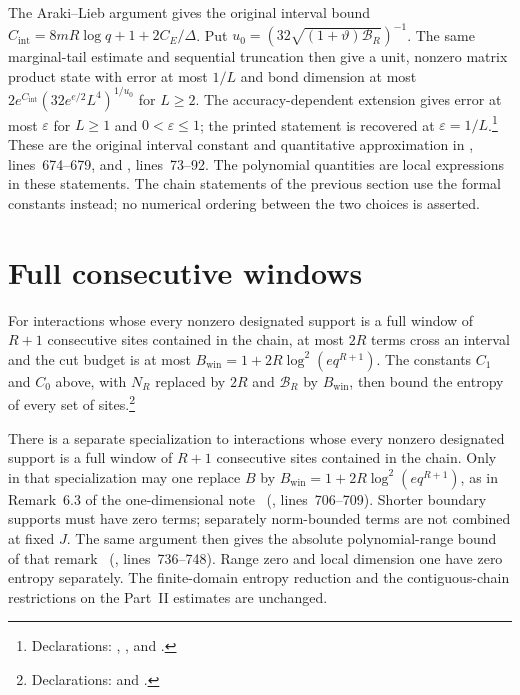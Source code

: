 \documentclass{article}
\begin{document}
The Araki--Lieb argument gives the original interval bound
$C_{\mathrm{int}}=8mR\log q+1+2C_E/\Delta$.
Put $u_0=(32\sqrt{(1+\vartheta)\mathcal B_R})^{-1}$.
The same marginal-tail estimate and sequential truncation then give a unit,
nonzero matrix product state with error at most $1/L$ and bond dimension at most
$2e^{C_{\mathrm{int}}}(32e^{e/2}L^4)^{1/u_0}$ for $L\ge2$.
The accuracy-dependent extension gives error at most $\varepsilon$ for
$L\ge1$ and $0<\varepsilon\le1$; the printed statement is recovered at
$\varepsilon=1/L$.\footnote{Declarations:
    ,
    , and
    .}
These are the original interval constant and quantitative approximation in
, lines~674--679, and
, lines~73--92.
The polynomial quantities are local expressions in these statements.
The chain statements of the previous section use the formal constants
instead; no numerical ordering between the two choices is asserted.

\section{Full consecutive windows}

For interactions whose every nonzero designated support is a full window of
$R+1$ consecutive sites contained in the chain, at most $2R$ terms cross an
interval and the cut budget is at most $B_{\mathrm{win}}=1+2R\log^2(e q^{R+1})$.
The constants $C_1$ and $C_0$ above, with $N_R$ replaced by $2R$ and
$\mathcal B_R$ by $B_{\mathrm{win}}$, then bound the entropy of every set of
sites.\footnote{Declarations:
    and .}

There is a separate specialization to interactions whose every nonzero
designated support is a full window of $R+1$ consecutive sites contained
in the chain. Only in that specialization may one replace $B$ by
$B_{\mathrm{win}}=1+2R\log^2(e q^{R+1})$, as in
Remark~6.3 of the one-dimensional note~\cite{TNLean2026OneDimensional}
(, lines~706--709). Shorter boundary supports must
have zero terms; separately norm-bounded terms are not combined at fixed
$J$. The same argument then gives the absolute polynomial-range bound of
that remark~\cite{TNLean2026OneDimensional}
(, lines~736--748). Range zero and local dimension one have zero
entropy separately. The finite-domain entropy reduction and the
contiguous-chain restrictions on the Part~II estimates are unchanged.
\end{document}
